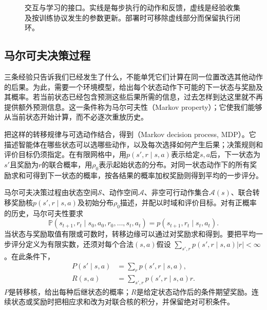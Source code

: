 \begin{figure}[htbp]
  \centering
  
  \caption{交互与学习的接口。实线是每步执行的动作和反馈，虚线是经验收集及按训练协议发生的参数更新。部署时可移除虚线部分而保留执行闭环。}
  \label{fig:rl-overview-loop}
\end{figure}

\subsection{马尔可夫决策过程}
\label{sec:rl-overview-mdp}

三条经验只告诉我们已经发生了什么，不能单凭它们计算在同一位置改选其他动作的后果。为此，需要一个环境模型，给出每个状态动作下可能的下一状态与奖励及其概率。若当前状态已经包含预测这些后果所需的信息，过去怎样到达这里就不再提供额外预测信息。这一条件称为马尔可夫性（Markov property）；它使我们能够从当前状态开始计算，而不必逐次重放历史。

把这样的转移规律与可选动作结合，得到（Markov decision process, MDP）。它描述智能体在哪些状态可以选哪些动作，以及每次选择如何产生后果；决策规则和评价目标仍须指定。在有限网格中，用$p(s',r\mid s,a)$表示给定$s,a$后，下一状态为$s'$且奖励为$r$的联合概率，用$\rho_0$表示起始状态的分布。对同一状态动作下的所有奖励求和可得到下一状态的概率，按各结果的概率加权奖励则得到平均的一步评分。

\begin{definition}[马尔可夫决策过程]
  \label{def:rl-overview-mdp}
  马尔可夫决策过程由状态空间$\mathcal S$、动作空间$\mathcal A$、非空可行动作集合$\mathcal A(s)$、联合转移奖励核$p(s',r\mid s,a)$及初始分布$\rho_0$描述，并配以时域和评价目标。对有正概率的历史，马尔可夫性要求
  \begin{equation}
    \mathbb P(s_{t+1},r_t\mid s_0,a_0,r_0,\ldots,s_t,a_t)
    =p(s_{t+1},r_t\mid s_t,a_t).
    \label{eq:rl-overview-markov}
  \end{equation}
  当状态与奖励取值有限或可数时，转移边缘可以通过对奖励求和得到。要把平均一步评分定义为有限实数，还须对每个合法$(s,a)$假设
  $\sum_{s',r}p(s',r\mid s,a)|r|<\infty$。在此条件下，
  \begin{equation}
  \begin{aligned}
    P(s'\mid s,a)&=\sum_r p(s',r\mid s,a),\\
    R(s,a)&=\sum_{s',r}p(s',r\mid s,a)r.
  \end{aligned}
  \label{eq:rl-overview-kernels}
  \end{equation}
  $P$是转移核，给出每种后继状态的概率；$R$是给定状态动作后的条件期望奖励。连续状态或奖励时把相应求和改为对联合核的积分，并保留绝对可积条件。
\end{definition}

